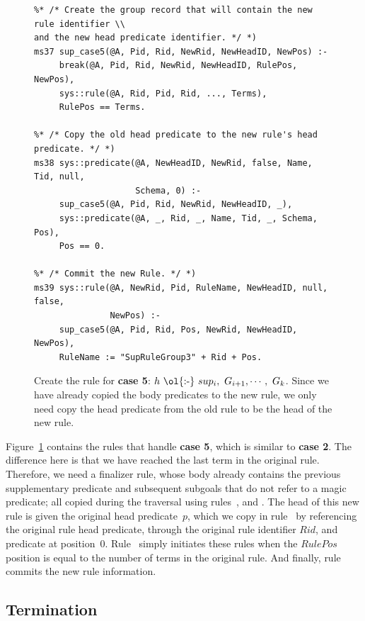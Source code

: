 \begin{figure}
\ssp
\centering
\begin{lstlisting}
%* /* Create the group record that will contain the new rule identifier \\
and the new head predicate identifier. */ *)
ms37 sup_case5(@A, Pid, Rid, NewRid, NewHeadID, NewPos) :-
     break(@A, Pid, Rid, NewRid, NewHeadID, RulePos, NewPos),
     sys::rule(@A, Rid, Pid, Rid, ..., Terms),
     RulePos == Terms.
	
%* /* Copy the old head predicate to the new rule's head predicate. */ *)
ms38 sys::predicate(@A, NewHeadID, NewRid, false, Name, Tid, null, 
                    Schema, 0) :-
     sup_case5(@A, Pid, Rid, NewRid, NewHeadID, _),
     sys::predicate(@A, _, Rid, _, Name, Tid, _, Schema, Pos),
     Pos == 0.
	
%* /* Commit the new Rule. */ *)
ms39 sys::rule(@A, NewRid, Pid, RuleName, NewHeadID, null, false, 
               NewPos) :-
     sup_case5(@A, Pid, Rid, Pos, NewRid, NewHeadID, NewPos),
     RuleName := "SupRuleGroup3" + Rid + Pos.
\end{lstlisting}
\caption{\label{ch:magic:fig:rewrite9} 
Create the rule for {\bf case 5}: $h\ \text{\ol{:-}}\ sup_i,\ G_{i+1}, \cdots,\ G_k$. 
Since we have already copied the body predicates to the new rule, we only
need copy the head predicate from the old rule to be the head of the new rule.}
\end{figure}

Figure~\ref{ch:magic:fig:rewrite9} contains the rules that handle {\bf case 5},
which is similar to {\bf case 2}.  The difference here is that we have reached
the last term in the original rule.  Therefore, we need a finalizer rule, whose
body already contains the previous supplementary predicate and subsequent
subgoals that do not refer to a magic predicate; all copied during the
 traversal using rules~,  and .  The
head of this new rule is given the original head predicate~$p$, which we copy
in rule~ by referencing the original rule head predicate, through the
original rule identifier $Rid$, and predicate at position~$0$.  Rule~
simply initiates these rules when the $RulePos$ position is equal to the number
of terms in the original rule.  And finally, rule~ commits the new
rule information.

\subsection{Termination}

